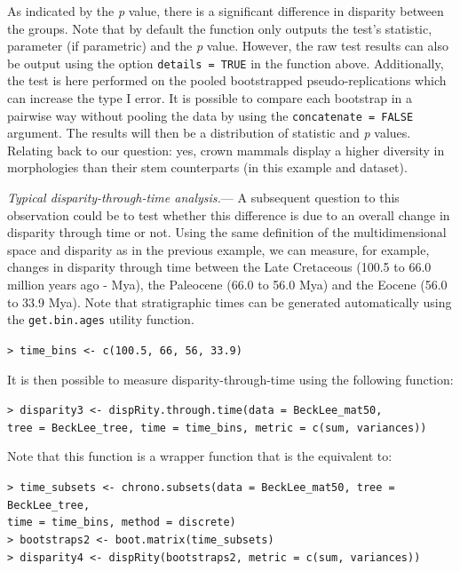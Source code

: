 \documentclass[12pt,letterpaper]{article}
\renewcommand{\subsubsection}[1]{%
\vspace{2ex}
\noindent
\textit{#1.}---}
\begin{document}
\bigskip
As indicated by the \textit{p} value, there is a significant difference in disparity between the groups.
Note that by default the function only outputs the test's statistic, parameter (if parametric) and the \textit{p} value. However, the raw test results can also be output using the option \texttt{details = TRUE} in the function above.
Additionally, the test is here performed on the pooled bootstrapped pseudo-replications which can increase the type I error.
It is possible to compare each bootstrap in a pairwise way without pooling the data by using the \texttt{concatenate = FALSE} argument.
The results will then be a distribution of statistic and \textit{p} values.
Relating back to our question: yes, crown mammals display a higher diversity in morphologies than their stem counterparts (in this example and dataset).

\subsubsection{Typical disparity-through-time analysis}
A subsequent question to this observation could be to test whether this difference is due to an overall change in disparity through time or not.
Using the same definition of the multidimensional space and disparity as in the previous example, we can measure, for example, changes in disparity through time between the Late Cretaceous (100.5 to 66.0 million years ago - Mya), the Paleocene (66.0 to 56.0 Mya) and the Eocene (56.0 to 33.9 Mya).
Note that stratigraphic times can be generated automatically using the \texttt{get.bin.ages} utility function.

\noindent
\texttt{> time\_bins <- c(100.5, 66, 56, 33.9)}

It is then possible to measure disparity-through-time using the following function:

\noindent
\texttt{> disparity3 <- dispRity.through.time(data = BeckLee\_mat50,}\\
\texttt{tree = BeckLee\_tree, time = time\_bins, metric = c(sum, variances))}

\noindent Note that this function is a wrapper function that is the equivalent to:

\noindent \texttt{> time\_subsets <- chrono.subsets(data = BeckLee\_mat50, tree = BeckLee\_tree,}\\ \texttt{time = time\_bins, method = \textquotedbl discrete\textquotedbl)}\\
\noindent \texttt{> bootstraps2 <- boot.matrix(time\_subsets)}\\
\noindent \texttt{> disparity4 <- dispRity(bootstraps2, metric = c(sum, variances))}\\
\end{document}

